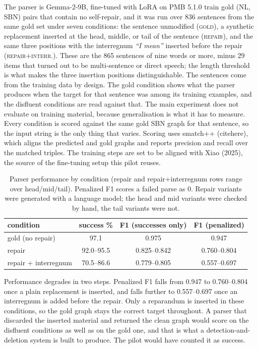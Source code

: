 \documentclass{article}
\begin{document}
The parser is Gemma-2-9B, fine-tuned with LoRA on PMB 5.1.0 train gold (NL, SBN)
pairs that contain no self-repair, and it was run over 836 sentences from
the same gold set under seven conditions: the sentence
unmodified (\textsc{gold}), a synthetic replacement inserted at the head,
middle, or tail of the sentence (\textsc{repair}), and the same three
positions with the interregnum \textit{``I mean''} inserted before the repair
(\textsc{repair+interr.}). These are the 865 sentences of nine words or more,
minus 29 items that turned out to be multi-sentence or direct speech; the length
threshold is what makes the three insertion positions distinguishable. The
sentences come from the training data by design. The gold condition shows what
the parser produces when the target for that sentence was among its training
examples, and the disfluent conditions are read against that. The main experiment
does not evaluate on training material, because generalisation is what it has to
measure. Every condition is scored against the same gold SBN graph for that sentence, so
the input string is the only thing that varies. Scoring uses smatch++
(citehere), which aligns the predicted and gold graphs and reports precision and
recall over the matched triples. The training steps are set to be aligned with Xiao
(2025), the source of the fine-tuning setup this pilot reuses.

\begin{table}[h]
\centering
\small
\begin{tabular}{lccc}
\toprule
condition & success \% & F1 (successes only) & F1 (penalized) \\
\midrule
gold (no repair) & 97.1 & 0.975 & 0.947 \\
repair & 92.0--95.5 & 0.825--0.842 & 0.760--0.804 \\
repair + interregnum & 70.5--86.6 & 0.779--0.805 & 0.557--0.697 \\
\bottomrule
\end{tabular}
\caption{Parser performance by condition (repair and repair+interregnum rows
range over head/mid/tail). Penalized F1 scores a failed parse as 0. Repair
variants were generated with a language model; the head and mid variants were
checked by hand, the tail variants were not.}
\label{tab:pilot-summary}
\end{table}

Performance degrades in two steps. Penalized F1 falls from 0.947 to
0.760--0.804 once a plain replacement is inserted, and falls further to
0.557--0.697 once an interregnum is added before the repair. Only a reparandum is
inserted in these conditions, so the gold graph stays the correct target
throughout. A parser that discarded the inserted material and returned the clean
graph would score on the disfluent conditions as well as on the gold one, and
that is what a detection-and-deletion system is built to produce. The pilot would
have counted it as success.
\end{document}
